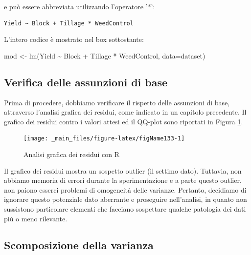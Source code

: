 \documentclass[a4paper,12pt,oneside]{book}
\newenvironment{Shaded}{\begin{snugshade}}{\end{snugshade}}
\newcommand{\SpecialCharTok}[1]{#1}
\newcommand{\OtherTok}[1]{#1}
\newcommand{\FunctionTok}[1]{#1}
\newcommand{\AttributeTok}[1]{#1}
\newcommand{\NormalTok}[1]{#1}
\begin{document}
e può essere abbreviata utilizzando l'operatore '*':

\begin{verbatim}
Yield ~ Block + Tillage * WeedControl
\end{verbatim}

L'intero codice è mostrato nel box sottostante:

\begin{Shaded}
\begin{Highlighting}[]
\NormalTok{mod }\OtherTok{\textless{}{-}} \FunctionTok{lm}\NormalTok{(Yield }\SpecialCharTok{\textasciitilde{}}\NormalTok{ Block }\SpecialCharTok{+}\NormalTok{ Tillage }\SpecialCharTok{*}\NormalTok{ WeedControl,}
          \AttributeTok{data=}\NormalTok{dataset)}
\end{Highlighting}
\end{Shaded}

\hypertarget{verifica-delle-assunzioni-di-base}{%
\subsection{Verifica delle assunzioni di base}\label{verifica-delle-assunzioni-di-base}}

Prima di procedere, dobbiamo verificare il rispetto delle assunzioni di base, attraverso l'analisi grafica dei residui, come indicato in un capitolo precedente. Il grafico dei residui contro i valori attesi ed il QQ-plot sono riportati in Figura \ref{fig:figName133}.

\begin{figure}

{\centering \texttt{[image: \_main\_files/figure-latex/figName133-1]} 

}

\caption{Analisi grafica dei residui con R}\label{fig:figName133}
\end{figure}

Il grafico dei residui mostra un sospetto outlier (il settimo dato). Tuttavia, non abbiamo memoria di errori durante la sperimentazione e a parte questo outlier, non paiono esserci problemi di omogeneità delle varianze. Pertanto, decidiamo di ignorare questo potenziale dato aberrante e proseguire nell'analisi, in quanto non sussistono particolare elementi che facciano sospettare qualche patologia dei dati più o meno rilevante.

\hypertarget{scomposizione-della-varianza-3}{%
\subsection{Scomposizione della varianza}\label{scomposizione-della-varianza-3}}
\end{document}
